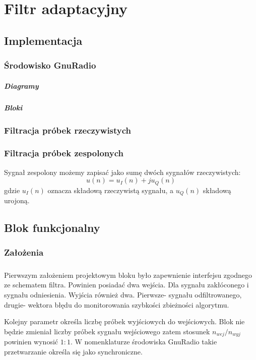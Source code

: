 \chapter{Filtr adaptacyjny}
\section{Implementacja}
\subsection{Środowisko GnuRadio}
\paragraph*{Diagramy}
\paragraph*{Bloki}
\subsection{Filtracja próbek rzeczywistych}
\subsection{Filtracja próbek zespolonych}
Sygnał zespolony możemy zapisać jako sumę dwóch sygnałów rzeczywistych:
\begin{equation}
u(n) = u_I(n) + ju_Q(n)
\end{equation}
gdzie $u_I(n)$ oznacza składową rzeczywistą sygnału, a $u_Q(n)$ składową urojoną.
\section{Blok funkcjonalny}
\subsection{Założenia}
\paragraph{}
Pierwszym założeniem projektowym bloku było zapewnienie interfejsu zgodnego ze schematem filtra. 
Powinien posiadać dwa wejścia. 
Dla sygnału zakłóconego i sygnału odniesienia. Wyjścia również dwa. 
Pierwsze- sygnału odfiltrowanego, drugie- wektora błędu do monitorowania szybkości zbieżności algorytmu.

Kolejny parametr określa liczbę próbek wyjściowych do wejściowych.
Blok nie będzie zmieniał liczby próbek sygnału wejściowego zatem stosunek $n_{wej}/n_{wyj}$
powinien wynosić $1:1$. W nomenklaturze środowiska GnuRadio takie przetwarzanie określa się jako synchroniczne.

